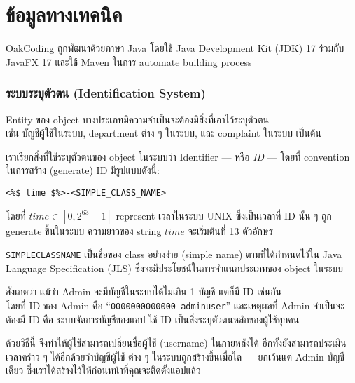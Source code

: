 \pagebreak[4]

\section*{ข้อมูลทางเทคนิค}

OakCoding ถูกพัฒนาด้วยภาษา Java โดยใช้ Java Development Kit (JDK) 17
\mbox{ร่วมกับ} JavaFX 17 และใช้ \href{https://maven.apache.org/}{Maven} ในการ automate building process

\subsubsection*{ระบบระบุตัวตน (Identification System)}

Entity ของ object บางประเภทมีความจำเป็นจะต้องมีสิ่งที่เอาไว้ระบุตัวตน\\
เช่น บัญชีผู้ใช้ในระบบ, department ต่าง ๆ ในระบบ, และ complaint ในระบบ เป็นต้น

เราเรียกสิ่งที่ใช้ระบุตัวตนของ object ในระบบว่า Identifier --- หรือ \emph{ID} --- โดยที่ convention
ในการสร้าง (generate) ID มีรูปแบบดังนี้:

\begin{lstlisting}[numbers=none,rulecolor=\oakrulecolor]
<%$ time $%>-<SIMPLE_CLASS_NAME>
\end{lstlisting}

โดยที่ $time \in [0, 2^{63}-1]$ represent เวลาในระบบ UNIX ซึ่งเป็นเวลาที่
ID นั้น ๆ ถูก generate ขึ้นในระบบ ความยาวของ string $time$ จะเริ่มต้นที่ 13 ตัวอักษร

\texttt{SIMPLE\textunderscore{}CLASS\textunderscore{}NAME} เป็นชื่อของ class อย่างง่าย (simple name) ตามที่ได้กำหนดไว้ใน
Java Language Specification (JLS) \mbox{\cite[JSL \S 6.2]{jsl-6.2}} ซึ่งจะมีประโยชน์ในการจำแนกประเภทของ object
ในระบบ

สังเกตว่า แม้ว่า Admin จะมีบัญชีในระบบได้ไม่เกิน 1 บัญชี แต่ก็มี ID เช่นกัน\\
โดยที่ ID ของ Admin คือ ``\texttt{0000000000000-adminuser}''
และเหตุผลที่ Admin จำเป็นจะต้องมี ID คือ ระบบจัดการบัญชีของแอป
ใช้ ID เป็นสิ่งระบุตัวตนหลักของ\mbox{ผู้ใช้}ทุกคน

ด้วยวิธีนี้ จึงทำให้ผู้ใช้สามารถเปลี่ยนชื่อผู้ใช้ (username) ในภายหลังได้
อีกทั้งยังสามารถประเมินเวลาคร่าว ๆ ได้อีกด้วยว่าบัญชีผู้ใช้
ต่าง ๆ ในระบบถูกสร้างขึ้นเมื่อใด --- ยกเว้นแต่ Admin บัญชีเดียว
ซึ่งเราได้สร้างไว้ให้ก่อนหน้าที่คุณจะติดตั้งแอปแล้ว

